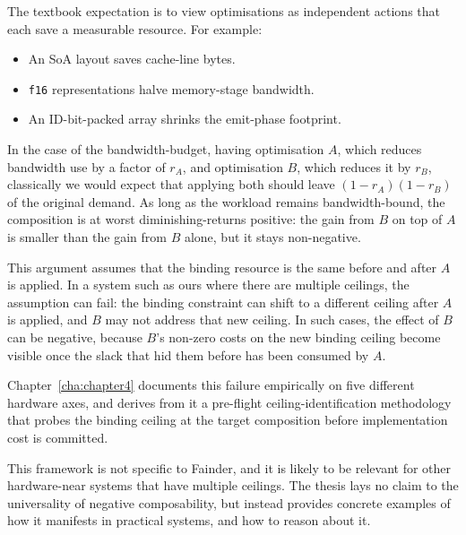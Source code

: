 The textbook expectation is to view optimisations as independent actions that each save a measurable resource. For example:
\begin{itemize}
  \item An SoA layout saves cache-line bytes.
  \item \texttt{f16} representations halve memory-stage bandwidth.
  \item An ID-bit-packed array shrinks the emit-phase footprint.
\end{itemize}

In the case of the bandwidth-budget, having optimisation $A$, which reduces bandwidth use by a factor of $r_A$, and optimisation $B$, which reduces it by $r_B$, classically we would expect that applying both should leave $(1 - r_A)(1 - r_B)$ of the original demand. As long as the workload remains bandwidth-bound, the composition is at worst diminishing-returns positive: the gain from $B$ on top of $A$ is smaller than the gain from $B$ alone, but it stays non-negative.

This argument assumes that the binding resource is the same before and after $A$ is applied. In a system such as ours where there are multiple ceilings, the assumption can fail: the binding constraint can shift to a different ceiling after $A$ is applied, and $B$ may not address that new ceiling. In such cases, the effect of $B$ can be negative, because $B$'s non-zero costs on the new binding ceiling become visible once the slack that hid them before has been consumed by $A$.

Chapter~\ref{cha:chapter4} documents this failure empirically on five different hardware axes, and derives from it a pre-flight ceiling-identification methodology that probes the binding ceiling at the target composition before implementation cost is committed.

This framework is not specific to Fainder, and it is likely to be relevant for other hardware-near systems that have multiple ceilings. The thesis lays no claim to the universality of negative composability, but instead provides concrete examples of how it manifests in practical systems, and how to reason about it.
